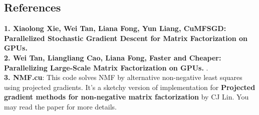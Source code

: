 \documentclass[12pt]{article}
\theoremstyle{remark}
\begin{document}
\begin{CJK}{UTF8}{bsmi}
\section{References}
\textbf{1. Xiaolong Xie, Wei Tan, Liana Fong, Yun Liang, CuMFSGD: Parallelized Stochastic Gradient Descent for Matrix Factorization on GPUs.}
\\
\textbf{2. Wei Tan, Liangliang Cao, Liana Fong, Faster and Cheaper: Parallelizing Large-Scale Matrix Factorization on GPUs. }.
\\
\textbf{3. NMF.cu}: This code solves NMF by alternative non-negative least squares using projected gradients. It's a sketchy version of implementation for \textbf{Projected gradient methods for non-negative matrix factorization} by CJ Lin. You may read the paper for more details.
\\

\end{CJK} 
\end{document}
